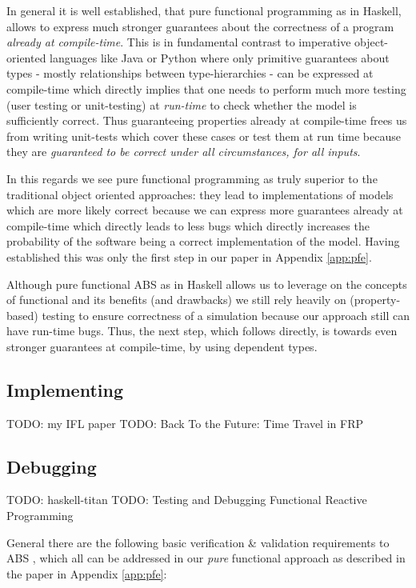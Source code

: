 In general it is well established, that pure functional programming as in Haskell, allows to express much stronger guarantees about the correctness of a program \textit{already at compile-time}. This is in fundamental contrast to imperative object-oriented languages like Java or Python where only primitive guarantees about types - mostly relationships between type-hierarchies - can be expressed at compile-time which directly implies that one needs to perform much more testing (user testing or unit-testing) at \textit{run-time} to check whether the model is sufficiently correct. Thus guaranteeing properties already at compile-time frees us from writing unit-tests which cover these cases or test them at run time because they are \textit{guaranteed to be correct under all circumstances, for all inputs}.

In this regards we see pure functional programming as truly superior to the traditional object oriented approaches: they lead to implementations of models which are more likely correct because we can express more guarantees already at compile-time which directly leads to less bugs which directly increases the probability of the software being a correct implementation of the model. Having established this was only the first step in our paper in Appendix \ref{app:pfe}. 

Although pure functional ABS as in Haskell allows us to leverage on the concepts of functional and its benefits (and drawbacks) we still rely heavily on (property-based) testing to ensure correctness of a simulation because our approach still can have run-time bugs. Thus, the next step, which follows directly, is towards even stronger guarantees at compile-time, by using dependent types. 


\subsection{Implementing}
TODO: my IFL paper
TODO: Back To the Future: Time Travel in FRP \cite{perez_back_2017}

\subsection{Debugging}
TODO: haskell-titan
TODO: Testing and Debugging Functional Reactive Programming \cite{perez_testing_2017}

General there are the following basic verification \& validation requirements to ABS \cite{robinson_simulation:_2014}, which all can be addressed in our \textit{pure} functional approach as described in the paper in Appendix \ref{app:pfe}:


